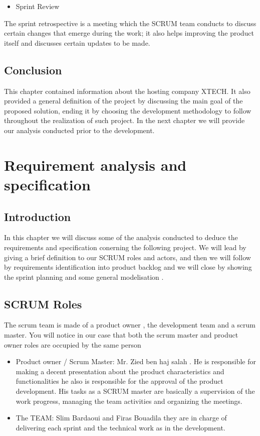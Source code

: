 \documentclass[]{report}
\begin{document}
\begin{itemize}
	\item Sprint Review
\end{itemize}

The sprint retrospective is a meeting which the SCRUM team conducts to
discuss certain changes that emerge during the work; it also helps improving the
product itself and discusses certain updates to be made.

\section{Conclusion}
This chapter contained information about the hosting company XTECH. It also
provided a general definition of the project by discussing the main goal of the
proposed solution, ending it by choosing the development methodology to
follow throughout the realization of such project. In the next chapter we will
provide our analysis conducted prior to the development.






\chapter{Requirement analysis and specification}
\section{Introduction}
In this chapter we will discuss some of the analysis conducted
to deduce the requirements and specification conerning the
following project. We will lead by giving a brief definition to
our SCRUM roles and actors, and then we will follow by
requirements identification into product backlog and we will
close by showing the sprint planning and some general
modelisation .
\section{SCRUM Roles}
The scrum team is made of a product owner , the development
team and a scrum master. You will notice in our case that both
the scrum master and product owner roles are occupied by the
same person
\begin{itemize}
	\item Product owner / Scrum Master: Mr. Zied ben haj salah .
	He is responsible for making a decent presentation about
	the product characteristics and functionalities he also is
	responsible for the approval of the product development.
	His tasks as a SCRUM master are basically a supervision
	of the work progress, managing the team activities and
	organizing the meetings.
	\item The TEAM: Slim Bardaoui and Firas Bouadila they are
	in charge of delivering each sprint and the technical work
	as in the development.
\end{itemize}
\end{document}
